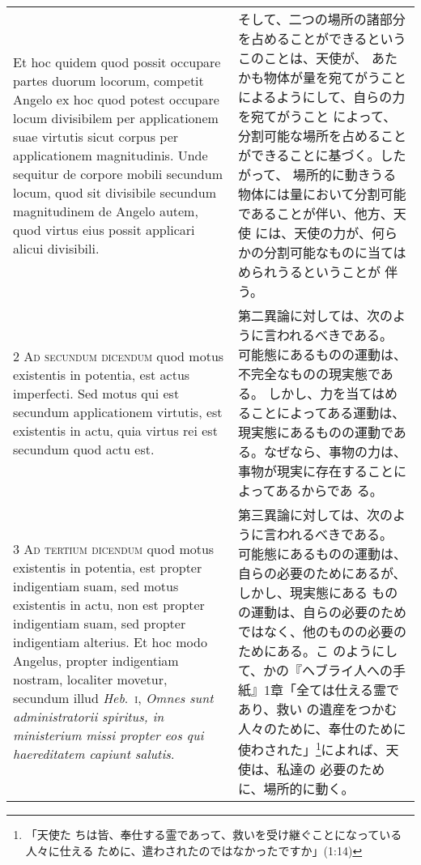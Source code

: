 \documentclass[10pt]{jsarticle} %
\begin{document}
\begin{longtable}{p{21em}p{21em}}
\\



Et
hoc quidem quod possit occupare partes duorum locorum, competit Angelo
ex hoc quod potest occupare locum divisibilem per applicationem suae
virtutis sicut corpus per applicationem magnitudinis. Unde sequitur de
corpore mobili secundum locum, quod sit divisibile secundum magnitudinem
de Angelo autem, quod virtus eius possit applicari alicui divisibili.

&

そして、二つの場所の諸部分を占めることができるというこのことは、天使が、
 あたかも物体が量を宛てがうことによるようにして、自らの力を宛てがうこと
 によって、分割可能な場所を占めることができることに基づく。したがって、
 場所的に動きうる物体には量において分割可能であることが伴い、他方、天使
 には、天使の力が、何らかの分割可能なものに当てはめられうるということが
 伴う。


\\


2 {\scshape Ad secundum dicendum} quod motus existentis in
potentia, est actus imperfecti. Sed motus qui est secundum applicationem
virtutis, est existentis in actu, quia virtus rei est secundum quod actu
est.

&

第二異論に対しては、次のように言われるべきである。
可能態にあるものの運動は、不完全なものの現実態である。
しかし、力を当てはめることによってある運動は、現実態にあるものの運動であ
 る。なぜなら、事物の力は、事物が現実に存在することによってあるからであ
 る。

\\


3 {\scshape Ad tertium dicendum} quod motus existentis in potentia, est
propter indigentiam suam, sed motus existentis in actu, non est propter
indigentiam suam, sed propter indigentiam alterius. Et hoc modo Angelus,
propter indigentiam nostram, localiter movetur, secundum illud {\itshape
Heb}.~{\scshape i}, {\itshape Omnes sunt administratorii spiritus, in
ministerium missi propter eos qui haereditatem capiunt salutis}.

&

第三異論に対しては、次のように言われるべきである。
可能態にあるものの運動は、自らの必要のためにあるが、しかし、現実態にある
 ものの運動は、自らの必要のためではなく、他のものの必要のためにある。こ
 のようにして、かの『ヘブライ人への手紙』1章「全ては仕える霊であり、救い
 の遺産をつかむ人々のために、奉仕のために使わされた」\footnote{「天使た
 ちは皆、奉仕する霊であって、救いを受け継ぐことになっている人々に仕える
 ために、遣わされたのではなかったですか」(1:14)}によれば、天使は、私達の
 必要のために、場所的に動く。



\end{longtable}
\end{document}
